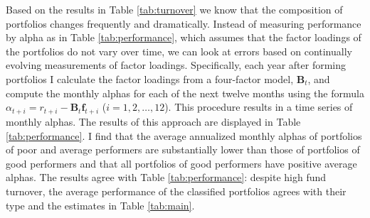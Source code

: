Based on the results in Table \ref{tab:turnover} we know that the composition of portfolios changes frequently and dramatically.  Instead of measuring performance by alpha as in Table \ref{tab:performance}, which assumes that the factor loadings of the portfolios do not vary over time, we can look at errors based on continually evolving measurements of factor loadings.  Specifically, each year after forming portfolios I calculate the factor loadings from a four-factor model, $\mathbf{B}_t$, and compute the monthly alphas for each of the next twelve months using the formula $\alpha_{t+i} = r_{t+i} - \mathbf{B}_t \mathbf{f}_{t+i}$ ($i=1, 2, \dots, 12$).  This procedure results in a time series of monthly alphas. The results of this approach are displayed in Table \ref{tab:performance}.  I find that the average annualized monthly alphas of portfolios of poor and average performers are substantially lower than those of portfolios of good performers and that all portfolios of good performers have positive average alphas.  The results agree with Table \ref{tab:performance}: despite high fund turnover, the average performance of the classified portfolios agrees with their type and the estimates in Table \ref{tab:main}.

